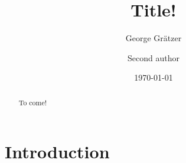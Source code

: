 \documentclass{amsart}
\begin{document}
\title{Title!}
\author{George Gr\"{a}tzer}
\address{Department of Mathematics\\
         University of Manitoba\\
         Winnipeg, MB R3T 2N2\\
         Canada} 
\author{Second author}
\address{line1\\
         line2\\
         line3\\
         line4} 

\date{\today}

\begin{abstract}
To come!
\end{abstract}

\maketitle

\section{Introduction}\label{S:intro} 

\begin{thebibliography}{9}

\end{thebibliography}
\end{document}
